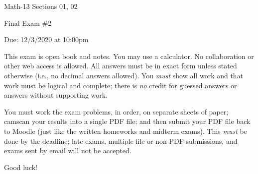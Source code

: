 \documentclass[letterpaper,12pt,fleqn]{article}
\begin{document}
\begin{center}
  \large
  Math-13 Sections 01, 02

  \Large
  Final Exam \#2

  Due: 12/3/2020 at 10:00pm
\end{center}

\vspace{0.5in}

This exam is open book and notes.  You may use a calculator.  No collaboration or other web access is allowed. All
answers must be in exact form unless stated otherwise (i.e., no decimal answers allowed).  You \emph{must} show all
work and that work must be logical and complete; there is \emph{no} credit for guessed answers or answers without
supporting work.

You must work the exam problems, in order, on separate sheets of paper; camscan your results into a single PDF
file; and then submit your PDF file back to Moodle (just like the written homeworks and midterm exams).  This
\emph{must} be done by the deadline; late exams, multiple file or non-PDF submissions, and exams sent by email will
not be accepted.

Good luck!

\vspace{0.5in}
\end{document}

